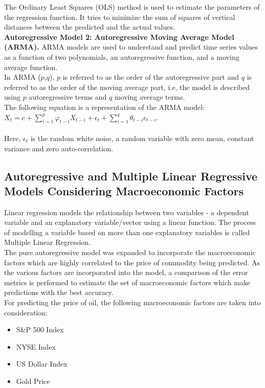 \documentclass[runningheads]{llncs}
\begin{document}
\noindent The Ordinary Least Squares (OLS) method is used to estimate the parameters of the regression function. It tries to minimize the sum of squares of vertical distances between the predicted and the actual values. \\

\noindent\textbf{Autoregressive Model 2: Autoregressive Moving Average Model (ARMA).} ARMA models are used to understand and predict time series values as a function of two polynomials, an autoregressive function, and a moving average function. 
\\

\noindent In ARMA ($p$,$q$), $p$ is referred to as the order of the autoregressive part and $q$ is referred to as the order of the moving average part, i.e, the model is described using $p$ autoregressive terms and $q$ moving average terms. \\
The following equation is a representation of the ARMA model:\\ 

$ X_{t} = c + \sum\limits_{i=1}^p \varphi_{t-i}X_{t-i} + \epsilon_{t} + \sum\limits_{i=1}^q \theta_{t-i}\epsilon_{t-i}$.\\\\

\noindent Here, $\epsilon_t$ is the random white noise, a random variable with zero mean, constant variance and zero auto-correlation. \\


\subsection{Autoregressive and Multiple Linear Regressive Models Considering Macroeconomic Factors}
Linear regression models the relationship between two variables - a dependent variable and an explanatory variable/vector using a linear function. The process of modelling a variable based on more than one explanatory variables is called Multiple Linear Regression. \\
   
\noindent The pure autoregressive model was expanded to incorporate the macroeconomic factors which are highly correlated to the price of commodity being predicted. As the various factors are incorporated into the model, a comparison of the error metrics is performed to estimate the set of macroeconomic factors which make predictions with the best accuracy. \\


\noindent For predicting the price of oil, the following macroeconomic factors are taken into consideration:
\begin {itemize}
\item S\&P 500 Index
\item NYSE Index
\item US Dollar Index
\item Gold Price
\end {itemize}
\end{document}
